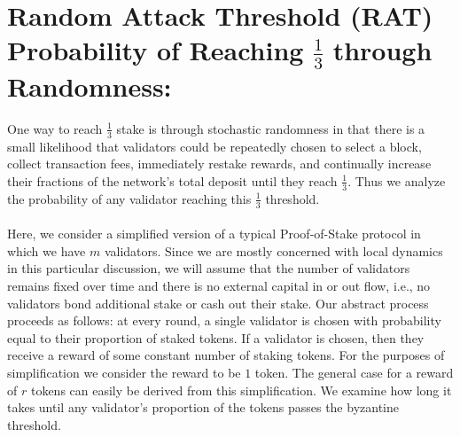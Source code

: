 \documentclass{article}
\renewcommand{\|}{\;|\;}
\begin{document}
\section{Random Attack Threshold (RAT) \\ Probability of Reaching $\frac{1}{3}$ through Randomness:}
One way to reach $\frac{1}{3}$ stake is through stochastic randomness in that there is a small likelihood that validators could be repeatedly chosen to select a block, collect transaction fees, immediately restake rewards, and continually increase their fractions of the network's total deposit until they reach $\frac{1}{3}$. Thus we analyze the probability of any validator reaching this $\frac{1}{3}$ threshold. \\ \\ Here, we consider a simplified version of a typical Proof-of-Stake protocol in which we have $m$ validators. Since we are mostly concerned with local dynamics in this particular discussion, we will assume that the number of validators remains fixed over time and there is no external capital in or out flow, i.e., no validators bond additional stake or cash out their stake. Our abstract process proceeds as follows: at every round, a single validator is chosen with probability equal to their proportion of staked tokens. If a validator is chosen, then they receive a reward of some constant number of staking tokens. For the purposes of simplification we consider the reward to be $1$ token. The general case for a reward of $r$ tokens can easily be derived from this simplification. We examine how long it takes until any validator’s proportion of the tokens passes the byzantine threshold.
\end{document}
